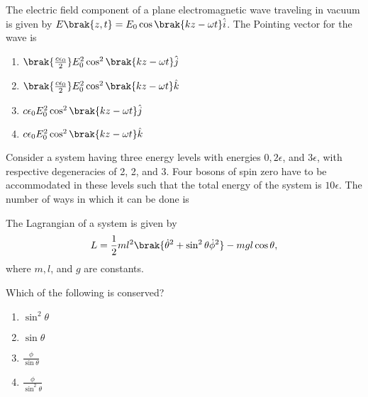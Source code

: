 
\iffalse
    \title{Assignment}
    \author{EE24BTECH11034}
    \section{ph}
    \chapter{2015}
  \fi
 \item The electric field component of a plane electromagnetic wave traveling in vacuum is given by $E\brak{z,t} = E_0 \cos\brak{kz - \omega t}\hat{i}$. The Pointing vector for the wave is

        \begin{enumerate}
            \item $\brak{\frac{c \epsilon_0}{2}}E_0^2 \cos^2\brak{kz - \omega t} \hat{j}$
            \item $\brak{\frac{c \epsilon_0}{2}}E_0^2 \cos^2\brak{kz - \omega t} \hat{k}$
            \item $c \epsilon_0 E_0^2 \cos^2\brak{kz - \omega t} \hat{j}$
            \item $c \epsilon_0 E_0^2 \cos^2\brak{kz - \omega t} \hat{k}$
        \end{enumerate}

    \item Consider a system having three energy levels with energies $0, 2\epsilon$, and $3\epsilon$, with respective degeneracies of 2, 2, and 3. Four bosons of spin zero have to be accommodated in these levels such that the total energy of the system is $10\epsilon$.  
 The number of ways in which it can be done is \underline{\hspace{2cm}}

    \item The Lagrangian of a system is given by
    $$L = \frac{1}{2}ml^2\brak{\dot{\theta}^2 + \sin^2\theta \dot{\phi}^2} - mgl\cos\theta,$$
    where $m, l$, and $g$ are constants.

    Which of the following is conserved?

    \begin{enumerate}
        \item $\sin^2\theta$
        \item $\sin\theta$
        \item $\frac{\phi}{\sin\theta}$
        \item $\frac{\phi}{\sin^2\theta}$
    \end{enumerate}

